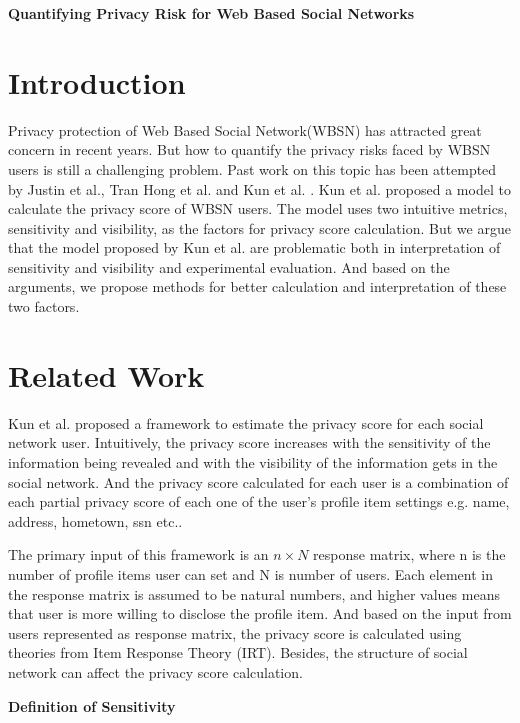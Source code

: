 \documentclass[a4paper]{article}
\begin{document}
\begin{center}
\textbf{\LARGE{Quantifying Privacy Risk for Web Based Social Networks}}
\end{center}

\section{Introduction\label{sec:intro}}
Privacy protection of Web Based Social Network(WBSN) has attracted
great concern in recent years. But how to quantify the privacy risks
faced by WBSN users is still a challenging problem. Past work on this
topic has been attempted by Justin et al.\cite{measure-privacy-risk},
Tran Hong et al. \cite{SN-quantify-privacy} and Kun et
al. \cite{SN-privacy-score}. Kun et al. proposed a model to calculate
the privacy score of WBSN users. The model uses two intuitive metrics,
sensitivity and visibility, as the factors for privacy score
calculation. But we argue that the model proposed by Kun et al. are
problematic both in interpretation of sensitivity and visibility and
experimental evaluation. And based on the arguments, we propose
methods for better calculation and interpretation of these two
factors.

\section{Related Work\label{sec:relatedwork}}
Kun et al. \cite{SN-privacy-score} proposed a framework to estimate
the privacy score for each social network user. Intuitively, the
privacy score increases with the sensitivity of the information being
revealed and with the visibility of the information gets in the social
network. And the privacy score calculated for each user is a
combination of each partial privacy score of each one of the user's
profile item settings e.g. name, address, hometown, ssn etc.. 

The primary input of this framework is an $n\times N$ response matrix,
where n is the number of profile items user can set and N is number of
users. Each element in the response matrix is assumed to be natural
numbers, and higher values means that user is more willing to disclose
the profile item. And based on the input from users represented as
response matrix, the privacy score is calculated using theories from
Item Response Theory (IRT). Besides, the structure of social network
can affect the privacy score calculation. 

\textbf{Definition of Sensitivity} 
\end{document}
